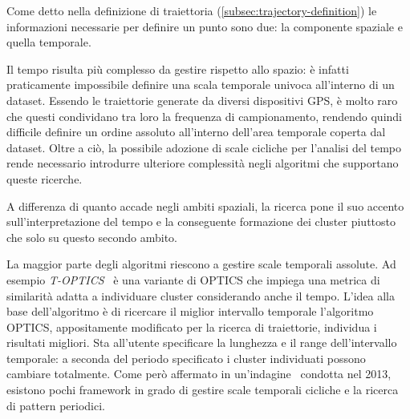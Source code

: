 
Come detto nella definizione di traiettoria (\cref{subsec:trajectory-definition})
le informazioni necessarie per definire un punto sono due: la componente spaziale e quella temporale.

Il tempo risulta più complesso da gestire rispetto allo spazio: è infatti praticamente impossibile
definire una scala temporale univoca all'interno di un dataset.
Essendo le traiettorie generate da diversi dispositivi GPS, è molto raro che questi condividano tra loro la frequenza
di campionamento, rendendo quindi difficile definire un ordine assoluto all'interno dell'area temporale
coperta dal dataset.
Oltre a ciò, la possibile adozione di scale cicliche per l'analisi del tempo rende necessario
introdurre ulteriore complessità negli algoritmi che supportano queste ricerche.

A differenza di quanto accade negli ambiti spaziali, la ricerca pone il suo accento
sull'interpretazione del tempo e la conseguente formazione dei cluster piuttosto che
solo su questo secondo ambito.

La maggior parte degli algoritmi riescono a gestire scale temporali assolute. Ad esempio
\textit{T-OPTICS}~\cite{nanni2006time} è una variante di OPTICS che impiega una metrica di similarità
adatta a individuare cluster considerando anche il tempo.
L'idea alla base dell'algoritmo è di ricercare il miglior intervallo temporale l'algoritmo OPTICS, appositamente modificato per la ricerca di traiettorie, individua i risultati migliori.
Sta all'utente specificare la lunghezza e il range dell'intervallo temporale: a seconda del periodo specificato i cluster individuati possono cambiare totalmente.
Come però affermato in un'indagine~\cite{mitsch2013survey} condotta nel 2013, esistono pochi framework in grado di gestire
scale temporali cicliche e la ricerca di pattern periodici.
